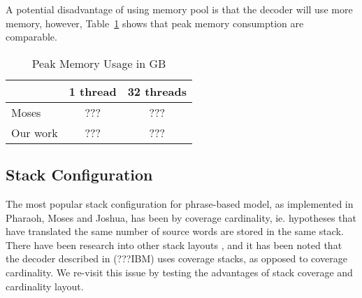 \documentclass[11pt]{article}
\begin{document}
A potential disadvantage of using memory pool is that the decoder will use more memory, however, Table~\ref{tab:memory-usage} shows that peak memory consumption are comparable.
\begin{table}[h]
\begin{center}
\begin{tabular}{|l|c|c|} \hline
		& 1 thread	& 32 threads \\ \hline
Moses  		& ???	 	& ??? \\
Our work 	& ??? 		& ??? \\ \hline
\end{tabular}
\end{center}
\caption{Peak Memory Usage in GB}
\label{tab:memory-usage}
\end{table}

\subsection{Stack Configuration}

The most popular stack configuration for phrase-based model, as implemented in Pharaoh, Moses and Joshua, has been by coverage cardinality, ie. hypotheses that have translated the same number of source words are stored in the same stack. There have been research into other stack layouts \citep{ortizmartinez-garciavarea-casacuberta:2006:WMT}, and it has been noted that the decoder described in (???IBM) uses coverage stacks, as opposed to coverage cardinality. We re-visit this issue by testing the advantages of stack coverage and cardinality layout. 
\end{document}
